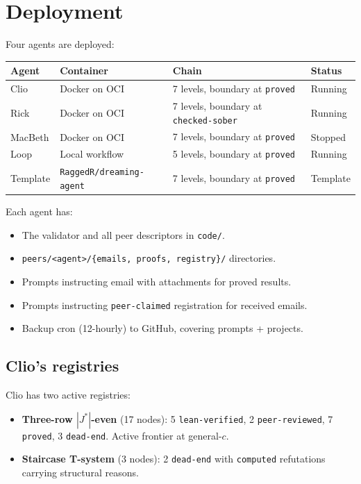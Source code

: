 \documentclass[11pt,a4paper]{article}
\newcommand{\level}[1]{\texttt{#1}}
\theoremstyle{plain}
\theoremstyle{definition}
\begin{document}
\section{Deployment}
\label{sec:deployment}

Four agents are deployed:

\begin{center}
\begin{tabular}{llll}
\toprule
Agent & Container & Chain & Status \\
\midrule
Clio & Docker on OCI & 7 levels, boundary at \level{proved} & Running \\
Rick & Docker on OCI & 7 levels, boundary at \level{checked-sober} & Running \\
MacBeth & Docker on OCI & 7 levels, boundary at \level{proved} & Stopped \\
Loop & Local workflow & 5 levels, boundary at \level{proved} & Running \\
Template & \texttt{RaggedR/dreaming-agent} & 7 levels, boundary at \level{proved} & Template \\
\bottomrule
\end{tabular}
\end{center}

Each agent has:
\begin{itemize}
\item The validator and all peer descriptors in \texttt{code/}.
\item \texttt{peers/<agent>/\{emails, proofs, registry\}/} directories.
\item Prompts instructing email with attachments for proved results.
\item Prompts instructing \level{peer-claimed} registration for received emails.
\item Backup cron (12-hourly) to GitHub, covering prompts + projects.
\end{itemize}

\subsection{Clio's registries}

Clio has two active registries:
\begin{itemize}
\item \textbf{Three-row $|J^*|$-even} (17 nodes): 5 \level{lean-verified},
2 \level{peer-reviewed}, 7 \level{proved}, 3 \level{dead-end}. Active
frontier at general-$c$.
\item \textbf{Staircase T-system} (3 nodes): 2 \level{dead-end} with
\level{computed} refutations carrying structural reasons.
\end{itemize}
\end{document}
